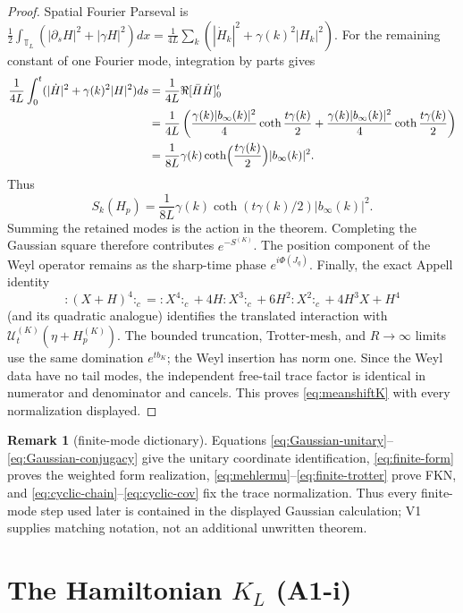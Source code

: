 \documentclass[11pt,a4paper]{article}
\theoremstyle{plain}
\theoremstyle{definition}
\newtheorem{remark}[theorem]{Remark}
\newcommand{\T}{\mathbb{T}}
\newcommand{\U}{\mathcal U}
\DeclareMathOperator{\cth}{coth}
\begin{document}
\begin{proof}
Spatial Fourier Parseval is
$\frac12\int_{\T_L}(|\partial_sH|^2+|\gamma H|^2)dx
=\frac1{4L}\sum_k(|\dot H_k|^2+\gamma(k)^2|H_k|^2)$.
For the remaining constant of one Fourier mode, integration by parts gives
\begin{align*}
 \frac1{4L}\int_0^t(|\dot H|^2+\gamma(k)^2|H|^2)ds
 &=\frac1{4L}\Re[\bar H\dot H]_0^t\\
 &=\frac1{4L}\left(
   \frac{\gamma(k)|b_\infty(k)|^2}{4}\cth\frac{t\gamma(k)}2
  +\frac{\gamma(k)|b_\infty(k)|^2}{4}\cth\frac{t\gamma(k)}2\right)\\
 &=\frac1{8L}\gamma(k)\cth\Bigl(\frac{t\gamma(k)}2\Bigr)
   |b_\infty(k)|^2.
\end{align*}
Thus
\[
 S_k(H_p)=\frac1{8L}\gamma(k)\cth(t\gamma(k)/2)|b_\infty(k)|^2.
\]
Summing the retained modes is the action in the theorem.  Completing the Gaussian
square therefore contributes $e^{-S^{(K)}}$.  The position component of the Weyl
operator remains as the sharp-time phase $e^{i\Phi(J_q)}$.  Finally, the exact Appell
identity
\[
 {:}(X+H)^4{:}_c={:}X^4{:}_c+4H{:}X^3{:}_c+6H^2{:}X^2{:}_c+4H^3X+H^4
\]
(and its quadratic analogue) identifies the translated interaction with
$\U_t^{(K)}(\eta+H_p^{(K)})$.  The bounded truncation, Trotter-mesh, and
$R\to\infty$ limits use the same domination $e^{tb_K}$; the Weyl insertion has
norm one.  Since the Weyl data have no tail modes, the independent free-tail trace
factor is identical in numerator and denominator and cancels.  This proves
\eqref{eq:meanshiftK} with every normalization displayed.
\end{proof}

\begin{remark}[finite-mode dictionary]\label{rem:finite-dictionary}
Equations \eqref{eq:Gaussian-unitary}--\eqref{eq:Gaussian-conjugacy} give the
unitary coordinate identification, \eqref{eq:finite-form} proves the weighted
form realization, \eqref{eq:mehlermu}--\eqref{eq:finite-trotter} prove FKN, and
\eqref{eq:cyclic-chain}--\eqref{eq:cyclic-cov} fix the trace normalization.
Thus every finite-mode step used later is contained in the displayed
Gaussian calculation; V1 supplies matching notation, not an additional
unwritten theorem.
\end{remark}

\section{The Hamiltonian $K_L$ (A1-i)}\label{sec:KL}
\end{document}
